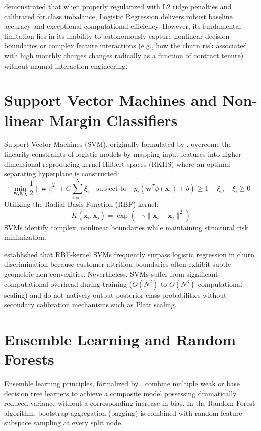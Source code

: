 \citet{coussement2008churn} demonstrated that when properly regularized with L2 ridge penalties and calibrated for class imbalance, Logistic Regression delivers robust baseline accuracy and exceptional computational efficiency. However, its fundamental limitation lies in its inability to autonomously capture nonlinear decision boundaries or complex feature interactions (e.g., how the churn risk associated with high monthly charges changes radically as a function of contract tenure) without manual interaction engineering.

\section{Support Vector Machines and Non-linear Margin Classifiers}
Support Vector Machines (SVM), originally formulated by \citet{cortes1995support}, overcome the linearity constraints of logistic models by mapping input features into higher-dimensional reproducing kernel Hilbert spaces (RKHS) where an optimal separating hyperplane is constructed:
\begin{equation}
    \min_{\mathbf{w}, b, \boldsymbol{\xi}} \frac{1}{2} \|\mathbf{w}\|^2 + C \sum_{i=1}^N \xi_i \quad \text{subject to} \quad y_i (\mathbf{w}^T \phi(\mathbf{x}_i) + b) \ge 1 - \xi_i, \quad \xi_i \ge 0
\end{equation}
Utilizing the Radial Basis Function (RBF) kernel:
\begin{equation}
    K(\mathbf{x}_i, \mathbf{x}_j) = \exp\left(-\gamma \|\mathbf{x}_i - \mathbf{x}_j\|^2\right)
\end{equation}
SVMs identify complex, nonlinear boundaries while maintaining structural risk minimization. 

\citet{coussement2008churn} established that RBF-kernel SVMs frequently surpass logistic regression in churn discrimination because customer attrition boundaries often exhibit subtle geometric non-convexities. Nevertheless, SVMs suffer from significant computational overhead during training ($O(N^2)$ to $O(N^3)$ computational scaling) and do not natively output posterior class probabilities without secondary calibration mechanisms such as Platt scaling.

\section{Ensemble Learning and Random Forests}
Ensemble learning principles, formalized by \citet{breiman2001random}, combine multiple weak or base decision tree learners to achieve a composite model possessing dramatically reduced variance without a corresponding increase in bias. In the Random Forest algorithm, bootstrap aggregation (bagging) is combined with random feature subspace sampling at every split node. 


